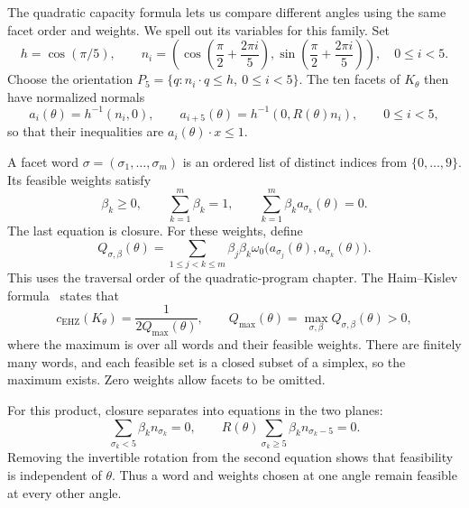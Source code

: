 The quadratic capacity formula lets us compare different angles using
the same facet order and weights. We spell out its variables for this
family. Set
\[
 h=\cos(\pi/5),\qquad
 n_i=\left(\cos\left(\frac\pi2+\frac{2\pi i}{5}\right),
           \sin\left(\frac\pi2+\frac{2\pi i}{5}\right)\right),
 \quad 0\le i<5.
\]
Choose the orientation $P_5=\{q:n_i\cdot q\le h,\ 0\le i<5\}$.
The ten facets of $K_\theta$ then have normalized normals
\[
 a_i(\theta)=h^{-1}(n_i,0),\qquad
 a_{i+5}(\theta)=h^{-1}(0,R(\theta)n_i),\qquad 0\le i<5,
\]
so that their inequalities are $a_i(\theta)\cdot x\le1$.

A facet word $\sigma=(\sigma_1,\ldots,\sigma_m)$ is an ordered list
of distinct indices from $\{0,\ldots,9\}$. Its feasible weights satisfy
\begin{equation}
 \beta_k\ge0,\qquad \sum_{k=1}^m\beta_k=1,\qquad
 \sum_{k=1}^m\beta_k a_{\sigma_k}(\theta)=0.
 \label{eq:pentagon-feasibility}
\end{equation}
The last equation is closure. For these weights, define
\begin{equation}
 Q_{\sigma,\beta}(\theta)=
 \sum_{1\le j<k\le m}\beta_j\beta_k
 \omega_0\bigl(a_{\sigma_j}(\theta),a_{\sigma_k}(\theta)\bigr).
 \label{eq:pentagon-q-definition}
\end{equation}
This uses the traversal order of the quadratic-program chapter.
The Haim--Kislev formula~\cite{HK2017} states that
\begin{equation}
 c_{\mathrm{EHZ}}(K_\theta)=\frac1{2Q_{\max}(\theta)},
 \qquad
 Q_{\max}(\theta)=\max_{\sigma,\beta}Q_{\sigma,\beta}(\theta)>0,
 \label{eq:pentagon-hk}
\end{equation}
where the maximum is over all words and their feasible weights.
There are finitely many words, and each feasible set is a closed subset
of a simplex, so the maximum exists. Zero weights allow facets to be
omitted.

For this product, closure separates into equations in the two planes:
\[
 \sum_{\sigma_k<5}\beta_k n_{\sigma_k}=0,
 \qquad
 R(\theta)\sum_{\sigma_k\ge5}\beta_k n_{\sigma_k-5}=0.
\]
Removing the invertible rotation from the second equation shows that
feasibility is independent of $\theta$. Thus a word and weights chosen
at one angle remain feasible at every other angle.

